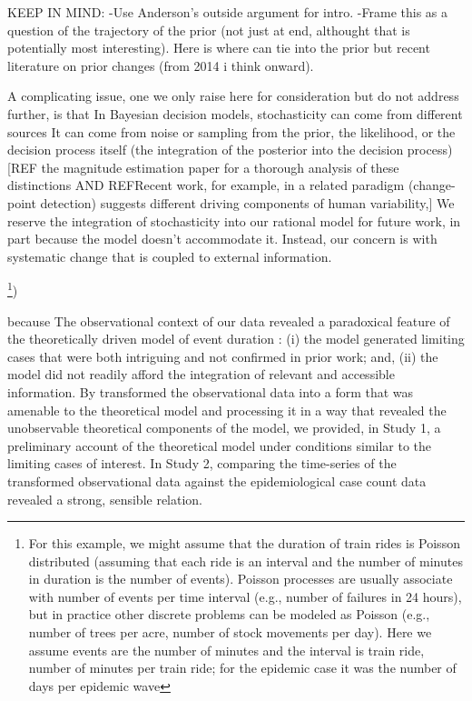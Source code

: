KEEP IN MIND:
-Use Anderson's outside argument for intro.
-Frame this as a question of the trajectory of the prior (not just at end, althought that is potentially most interesting). Here is where can tie into the prior but recent literature on prior changes (from 2014 i think onward).


A complicating issue, one we only raise here for consideration but do not address further, is that In Bayesian decision models, stochasticity can come from different sources  It can come from noise or sampling from the prior, the likelihood, or the decision process itself (the integration of the posterior into the decision process) [REF the magnitude estimation paper for a thorough analysis of these distinctions AND REFRecent work, for example, in a related paradigm (change-point detection) suggests different driving components of human variability,]  We reserve the integration of stochasticity into our rational model for future work, in part because the model doesn't accommodate it.  Instead, our concern is with systematic change that is coupled to external information.

\footnote{For this example, we might assume that the duration of train rides is Poisson distributed (assuming that each ride is an interval and the number of minutes in duration is the number of events). Poisson processes are usually associate with number of events per time interval (e.g., number of failures in 24 hours), but in practice other discrete problems can be modeled as Poisson (e.g., number of trees per acre, number of stock movements per day).  Here we assume events are the number of minutes and the interval is train ride, number of minutes per train ride; for the epidemic case it was the number of days per epidemic wave})


because The observational context of our data revealed a paradoxical feature of the theoretically driven model of event duration  :  (i) the model generated limiting cases that were both intriguing and not confirmed in prior work; and, (ii) the model did not readily afford the integration of relevant and accessible information.  By transformed the observational data into a form that was amenable to the theoretical model and processing it in a way that revealed the unobservable theoretical components of the model, we provided, in Study 1, a preliminary account of the theoretical model under conditions similar to the limiting cases of interest.  In Study 2, comparing the time-series of the transformed observational data against the epidemiological case count data revealed a strong, sensible relation. 

